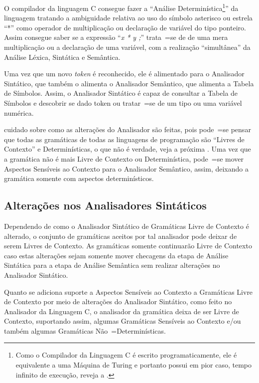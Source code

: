     O compilador da linguagem C consegue fazer a ``Análise Determinística\footnote{
    Como o Compilador da Linguagem C é escrito programaticamente,
    ele é equivalente a uma Máquina de Turing e
    portanto possui em pior caso,
    tempo infinito de execução,
    reveja a .
    }'' da linguagem tratando a ambiguidade relativa ao uso do símbolo asterisco ou
    estrela ``*'' como operador de multiplicação ou
    declaração de variável do tipo ponteiro.
    Assim consegue saber se a expressão ``\textit{x * y ;}'' trata~=se de de uma mera multiplicação ou
    a declaração de uma variável,
    com a realização ``simultânea'' da Análise Léxica,
    Sintática e
    Semântica.

    Uma vez que um novo \textit{token} é reconhecido,
    ele é alimentado para o Analisador Sintático,
    que também o alimenta o Analisador Semântico,
    que alimenta a Tabela de Símbolos.
    Assim,
    o Analisador Sintático é capaz de consultar a Tabela de Símbolos \cite{ahoCompilerDragonBook} e
    descobrir se dado token ou
    tratar~=se de um tipo ou
    uma variável numérica.

     cuidado sobre como as alterações do Analisador são feitas,
    pois pode~=se pensar que todas as gramáticas de todas as linguagens de programação são ``Livres de Contexto'' e
    Determinísticas,
    o que não é verdade,
    veja a próxima .
    Uma vez que a gramática não é mais Livre de Contexto ou
    Determinística,
    pode~=se mover Aspectos Sensíveis ao Contexto para o Analisador Semântico,
    assim,
    deixando a gramática somente com aspectos determinísticos.


\subsection{Alterações nos Analisadores Sintáticos}
\label{alteracoesNosAnalisadoresSintaticos}

    Dependendo de como o Analisador Sintático de Gramáticas Livre de Contexto é alterado,
    o conjunto de gramáticas aceitos por tal analisador pode deixar de serem Livres de Contexto.
    As gramáticas somente continuarão Livre de Contexto caso estas alterações sejam somente mover checagens da etapa de Análise Sintática para a etapa de Análise Semântica sem realizar alterações no Analisador Sintático.

    Quanto se adiciona suporte a Aspectos Sensíveis ao Contexto \cite{contextSensitiveParsing} a Gramáticas Livre de Contexto por meio de alterações do Analisador Sintático,
    como feito no Analisador da Linguagem C,
    o analisador da gramática deixa de ser Livre de Contexto,
    suportando assim,
    algumas Gramáticas Sensíveis ao Contexto e\slash{}ou também algumas Gramáticas Não~=Determinísticas.

